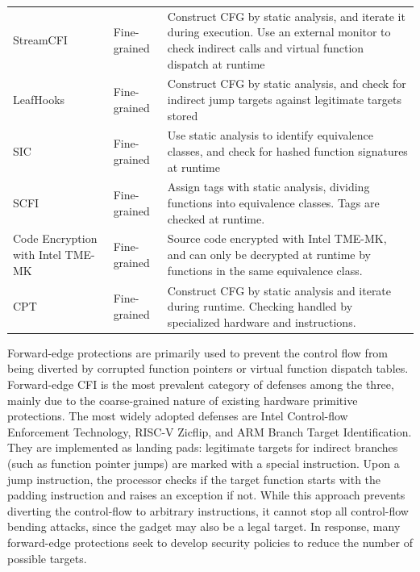 \documentclass[journal,onecolumn]{IEEEtran}
\begin{document}
\begin{table}[t]
\begin{tabularx}{\columnwidth}{
			>{\raggedright\arraybackslash}p{}
			>{\centering\arraybackslash}p{}
			>{\raggedright\arraybackslash}X
		}
		StreamCFI \cite{Kleftogiorgos26} &
		Fine-grained &
		Construct CFG by static analysis, and iterate it during execution. Use an external monitor to check indirect calls and virtual function dispatch at runtime \\[2pt]
		
		LeafHooks \cite{Zhao25b} &
		Fine-grained &
		Construct CFG by static analysis, and check for indirect jump targets against legitimate targets stored \\[2pt]
		
		SIC \cite{Hashemi26} &
		Fine-grained &
		Use static analysis to identify equivalence classes, and check for hashed function signatures at runtime \\[2pt]
		
		SCFI \cite{She24} &
		Fine-grained &
		Assign tags with static analysis, dividing functions into equivalence classes. Tags are checked at runtime. \\[2pt]
		
		Code Encryption with Intel TME-MK \cite{Unterguggenberger26} &
		Fine-grained &
		Source code encrypted with Intel TME-MK, and can only be decrypted at runtime by functions in the same equivalence class. \\[2pt]
		
		CPT \cite{Kim23} &
		Fine-grained &
		Construct CFG by static analysis and iterate during runtime. Checking handled by specialized hardware and instructions. \\[2pt]
		
		\bottomrule
	\end{tabularx}
\end{table}

Forward-edge protections are primarily used to prevent the control flow from being diverted by corrupted function pointers or virtual function dispatch tables. Forward-edge CFI is the most prevalent category of defenses among the three, mainly due to the coarse-grained nature of existing hardware primitive protections. The most widely adopted defenses are Intel Control-flow Enforcement Technology\cite{IntelIBT}, RISC-V Zicflip\cite{RISCVInstructionSet}, and ARM Branch Target Identification\cite{ARMBTI}. They are implemented as landing pads: legitimate targets for indirect branches (such as function pointer jumps) are marked with a special instruction. Upon a jump instruction, the processor checks if the target function starts with the padding instruction and raises an exception if not. While this approach prevents diverting the control-flow to arbitrary instructions, it cannot stop all control-flow bending attacks, since the gadget may also be a legal target. In response, many forward-edge protections seek to develop security policies to reduce the number of possible targets.
\end{document}
